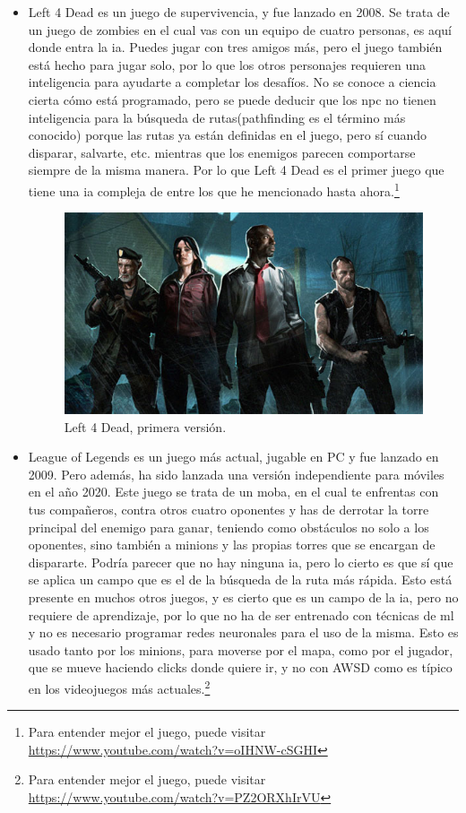 \begin{itemize}
	\item Left 4 Dead es un juego de supervivencia, y fue lanzado en 2008. Se trata de un juego de zombies en el cual vas con un equipo de cuatro personas, es aquí donde entra la \gls{ia}. Puedes jugar con tres amigos más, pero el juego también está hecho para jugar solo, por lo que los otros personajes requieren una inteligencia para ayudarte a completar los desafíos. No se conoce a ciencia cierta cómo está programado, pero se puede deducir que los \gls{npc} no tienen inteligencia para la búsqueda de rutas(pathfinding es el término más conocido) porque las rutas ya están definidas en el juego, pero sí cuando disparar, salvarte, etc.  mientras que los enemigos parecen comportarse siempre de la misma manera. Por lo que Left 4 Dead es el primer juego que tiene una \gls{ia} compleja de entre los que he mencionado hasta ahora.\footnote{Para entender mejor el juego, puede visitar \url{https://www.youtube.com/watch?v=oIHNW-cSGHI}}
	\begin{figure}[h]
		\centering
		\includegraphics[width=15cm]{archivos/imagenes/Left-4-Dead.jpg}
		\caption{Left 4 Dead, primera versión.}
	\end{figure}
	\item League of Legends es un juego más actual, jugable en PC y fue lanzado en 2009. Pero además, ha sido lanzada una versión independiente para móviles en el año 2020. Este juego se trata de un \gls{moba}, en el cual te enfrentas con tus compañeros, contra otros cuatro oponentes y has de derrotar la torre principal del enemigo para ganar, teniendo como obstáculos no solo a los oponentes, sino también a minions y las propias torres que se encargan de dispararte. Podría parecer que no hay ninguna \gls{ia}, pero lo cierto es que sí que se aplica un campo que es el de la búsqueda de la ruta más rápida. Esto está presente en muchos otros juegos, y es cierto que es un campo de la \gls{ia}, pero no requiere de aprendizaje, por lo que no ha de ser entrenado con técnicas de \gls{ml} y no es necesario programar redes neuronales para el uso de la misma. Esto es usado tanto por los minions, para moverse por el mapa, como por el jugador, que se mueve haciendo clicks donde quiere ir, y no con AWSD como es típico en los videojuegos más actuales.\footnote{Para entender mejor el juego, puede visitar \url{https://www.youtube.com/watch?v=PZ2ORXhIrVU}}

\end{itemize}
